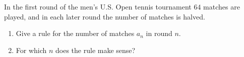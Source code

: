 In the first round of the men's U.S. Open tennis tournament $64$ matches are played, and in each later round the number of matches is halved.
\begin{enumerate}
\item[(a)] Give a rule for the number of matches $a_n$ in round $n$.
\item[(b)] For which $n$ does the rule make sense?
\end{enumerate}
